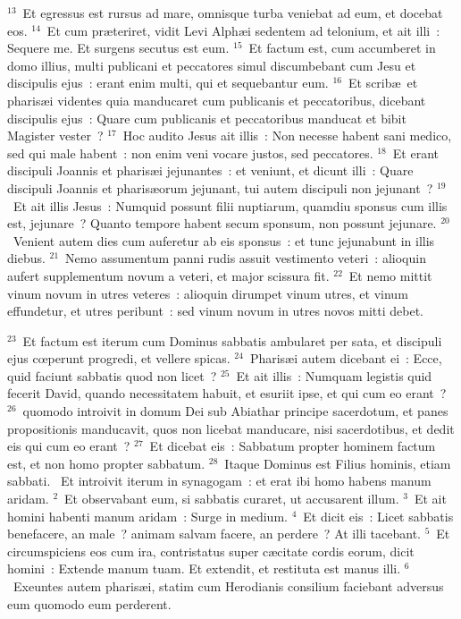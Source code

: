 ${}^{13}$~Et egressus est rursus ad mare, omnisque turba veniebat ad eum, et docebat eos.
${}^{14}$~Et cum pr\ae teriret, vidit Levi Alph\ae i sedentem ad telonium, et ait illi~: Sequere me. Et surgens secutus est eum.
${}^{15}$~Et factum est, cum accumberet in domo illius, multi publicani et peccatores simul discumbebant cum Jesu et discipulis ejus~: erant enim multi, qui et sequebantur eum.
${}^{16}$~Et scrib\ae\ et pharis\ae i videntes quia manducaret cum publicanis et peccatoribus, dicebant discipulis ejus~: Quare cum publicanis et peccatoribus manducat et bibit Magister vester~?
${}^{17}$~Hoc audito Jesus ait illis~: Non necesse habent sani medico, sed qui male habent~: non enim veni vocare justos, sed peccatores.
${}^{18}$~Et erant discipuli Joannis et pharis\ae i jejunantes~: et veniunt, et dicunt illi~: Quare discipuli Joannis et pharis\ae orum jejunant, tui autem discipuli non jejunant~?
${}^{19}$~Et ait illis Jesus~: Numquid possunt filii nuptiarum, quamdiu sponsus cum illis est, jejunare~? Quanto tempore habent secum sponsum, non possunt jejunare.
${}^{20}$~Venient autem dies cum auferetur ab eis sponsus~: et tunc jejunabunt in illis diebus.
${}^{21}$~Nemo assumentum panni rudis assuit vestimento veteri~: alioquin aufert supplementum novum a veteri, et major scissura fit.
${}^{22}$~Et nemo mittit vinum novum in utres veteres~: alioquin dirumpet vinum utres, et vinum effundetur, et utres peribunt~: sed vinum novum in utres novos mitti debet.


${}^{23}$~Et factum est iterum cum Dominus sabbatis ambularet per sata, et discipuli ejus cœperunt progredi, et vellere spicas.
${}^{24}$~Pharis\ae i autem dicebant ei~: Ecce, quid faciunt sabbatis quod non licet~?
${}^{25}$~Et ait illis~: Numquam legistis quid fecerit David, quando necessitatem habuit, et esuriit ipse, et qui cum eo erant~?
${}^{26}$~quomodo introivit in domum Dei sub Abiathar principe sacerdotum, et panes propositionis manducavit, quos non licebat manducare, nisi sacerdotibus, et dedit eis qui cum eo erant~?
${}^{27}$~Et dicebat eis~: Sabbatum propter hominem factum est, et non homo propter sabbatum.
${}^{28}$~Itaque Dominus est Filius hominis, etiam sabbati.
~\lettrine[lines=10,image=true,loversize=0.05,lraise=-0.03]{E}{}t introivit iterum in synagogam~: et erat ibi homo habens manum aridam.
${}^{2}$~Et observabant eum, si sabbatis curaret, ut accusarent illum.
${}^{3}$~Et ait homini habenti manum aridam~: Surge in medium.
${}^{4}$~Et dicit eis~: Licet sabbatis benefacere, an male~? animam salvam facere, an perdere~? At illi tacebant.
${}^{5}$~Et circumspiciens eos cum ira, contristatus super c\ae citate cordis eorum, dicit homini~: Extende manum tuam. Et extendit, et restituta est manus illi.
${}^{6}$~Exeuntes autem pharis\ae i, statim cum Herodianis consilium faciebant adversus eum quomodo eum perderent.



